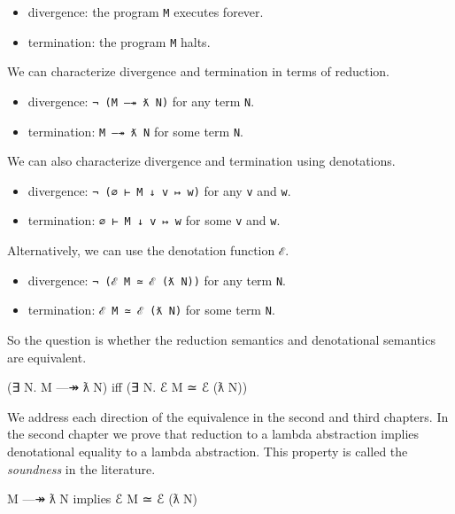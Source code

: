\begin{itemize}
\tightlist
\item
  divergence: the program \texttt{M} executes forever.
\item
  termination: the program \texttt{M} halts.
\end{itemize}

We can characterize divergence and termination in terms of reduction.

\begin{itemize}
\tightlist
\item
  divergence: \texttt{¬\ (M\ —↠\ ƛ\ N)} for any term \texttt{N}.
\item
  termination: \texttt{M\ —↠\ ƛ\ N} for some term \texttt{N}.
\end{itemize}

We can also characterize divergence and termination using denotations.

\begin{itemize}
\tightlist
\item
  divergence: \texttt{¬\ (∅\ ⊢\ M\ ↓\ v\ ↦\ w)} for any \texttt{v} and
  \texttt{w}.
\item
  termination: \texttt{∅\ ⊢\ M\ ↓\ v\ ↦\ w} for some \texttt{v} and
  \texttt{w}.
\end{itemize}

Alternatively, we can use the denotation function \texttt{ℰ}.

\begin{itemize}
\tightlist
\item
  divergence: \texttt{¬\ (ℰ\ M\ ≃\ ℰ\ (ƛ\ N))} for any term \texttt{N}.
\item
  termination: \texttt{ℰ\ M\ ≃\ ℰ\ (ƛ\ N)} for some term \texttt{N}.
\end{itemize}

So the question is whether the reduction semantics and denotational
semantics are equivalent.

\begin{myDisplay}
(∃ N. M —↠ ƛ N)  iff  (∃ N. ℰ M ≃ ℰ (ƛ N))
\end{myDisplay}

We address each direction of the equivalence in the second and third
chapters. In the second chapter we prove that reduction to a lambda
abstraction implies denotational equality to a lambda abstraction. This
property is called the \emph{soundness} in the literature.

\begin{myDisplay}
M —↠ ƛ N  implies  ℰ M ≃ ℰ (ƛ N)
\end{myDisplay}

